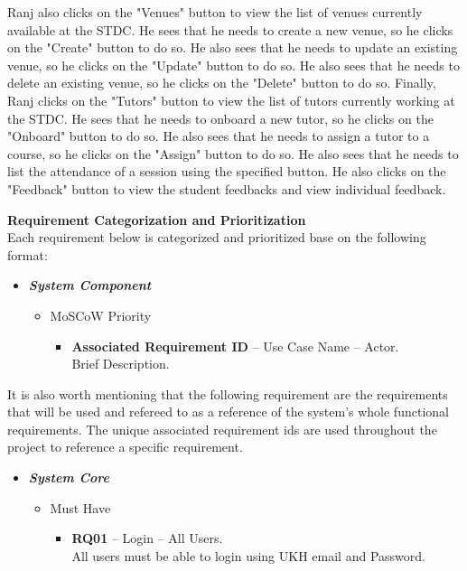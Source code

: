 \begin{justify}
    Ranj also clicks on the "Venues" button to view the list of venues currently available at the STDC. He sees that he needs to create a new venue, so he clicks on the "Create" button to do so. He also sees that he needs to update an existing venue, so he clicks on the "Update" button to do so. He also sees that he needs to delete an existing venue, so he clicks on the "Delete" button to do so. \newendline
    Finally, Ranj clicks on the "Tutors" button to view the list of tutors currently working at the STDC. He sees that he needs to onboard a new tutor, so he clicks on the "Onboard" button to do so. He also sees that he needs to assign a tutor to a course, so he clicks on the "Assign" button to do so. He also sees that he needs to list the attendance of a session using the specified button. He also clicks on the "Feedback" button to view the student feedbacks and view individual feedback.    


    \newendline\textbf{Requirement Categorization and Prioritization}\\
    Each requirement below is categorized and prioritized base on the following format: 
    \begin{itemize}
        \item \textbf{\textit{System Component}}
            \begin{itemize}
                \item MoSCoW Priority
                    \begin{itemize}
                        \item \textbf{\textcolor{vin}{Associated Requirement ID}} -- Use Case Name -- Actor.\\Brief Description.
                    \end{itemize}
            \end{itemize}
    \end{itemize}

    \noindent It is also worth mentioning that the following requirement are the requirements that will be used and refereed to as a reference of the system's whole functional requirements. The unique associated requirement ids are used throughout the project to reference a specific requirement.\newendline
    
    \begin{itemize}
        \item \textbf{\textit{System Core}}
            \begin{itemize}
                \item Must Have
                    \begin{itemize}
                        \item \textbf{\textcolor{vin}{RQ01}} -- Login -- All Users.\\All users must be able to login using UKH email and Password.
        

\end{itemize}
\end{itemize}
\end{itemize}
\end{justify}
